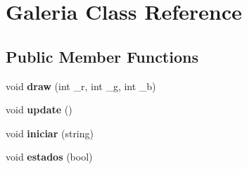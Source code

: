 \hypertarget{class_galeria}{}\section{Galeria Class Reference}
\label{class_galeria}
\subsection*{Public Member Functions}
\begin{DoxyCompactItemize}
\item 
\hypertarget{class_galeria_af84e99d4e22f270a529ef9dfd70d1969}{}void {\bfseries draw} (int \+\_\+r, int \+\_\+g, int \+\_\+b)\label{class_galeria_af84e99d4e22f270a529ef9dfd70d1969}

\item 
\hypertarget{class_galeria_a244acbd54d750de065d4818b0760bb89}{}void {\bfseries update} ()\label{class_galeria_a244acbd54d750de065d4818b0760bb89}

\item 
\hypertarget{class_galeria_a9f0369c78d54b6a2f79d7c5ce57a2f4c}{}void {\bfseries iniciar} (string)\label{class_galeria_a9f0369c78d54b6a2f79d7c5ce57a2f4c}

\item 
\hypertarget{class_galeria_a03137917c2162823a6b733d314ef0d06}{}void {\bfseries estados} (bool)\label{class_galeria_a03137917c2162823a6b733d314ef0d06}

\end{DoxyCompactItemize}
